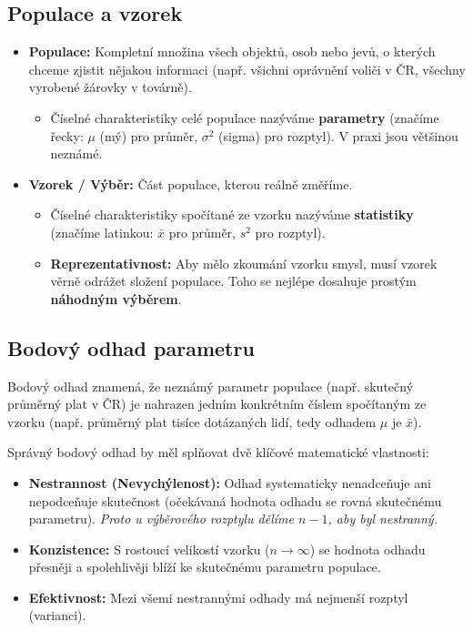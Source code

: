 \subsection{Populace a vzorek}
\begin{itemize}
    \item \textbf{Populace:} Kompletní množina všech objektů, osob nebo jevů, o kterých chceme zjistit nějakou informaci (např. všichni oprávnění voliči v ČR, všechny vyrobené žárovky v továrně).
    \begin{itemize}
        \item Číselné charakteristiky celé populace nazýváme \textbf{parametry} (značíme řecky: $\mu$ (mý) pro průměr, $\sigma^2$ (sigma) pro rozptyl). V praxi jsou většinou neznámé.
    \end{itemize}
    \item \textbf{Vzorek / Výběr:} Část populace, kterou reálně změříme. 
    \begin{itemize}
        \item Číselné charakteristiky spočítané ze vzorku nazýváme \textbf{statistiky} (značíme latinkou: $\bar{x}$ pro průměr, $s^2$ pro rozptyl).
        \item \textbf{Reprezentativnost:} Aby mělo zkoumání vzorku smysl, musí vzorek věrně odrážet složení populace. Toho se nejlépe dosahuje prostým \textbf{náhodným výběrem}.
    \end{itemize}
\end{itemize}

\subsection{Bodový odhad parametru}
Bodový odhad znamená, že neznámý parametr populace (např. skutečný průměrný plat v ČR) je nahrazen jedním konkrétním číslem spočítaným ze vzorku (např. průměrný plat tisíce dotázaných lidí, tedy odhadem $\mu$ je $\bar{x}$).

Správný bodový odhad by měl splňovat dvě klíčové matematické vlastnosti:
\begin{itemize}
    \item \textbf{Nestrannost (Nevychýlenost):} Odhad systematicky nenadceňuje ani nepodceňuje skutečnost (očekávaná hodnota odhadu se rovná skutečnému parametru). \textit{Proto u výběrového rozptylu dělíme $n-1$, aby byl nestranný.}
    \item \textbf{Konzistence:} S rostoucí velikostí vzorku ($n \to \infty$) se hodnota odhadu přesněji a spolehlivěji blíží ke skutečnému parametru populace.
    \item \textbf{Efektivnost:} Mezi všemi nestrannými odhady má nejmenší rozptyl (varianci).
\end{itemize}

